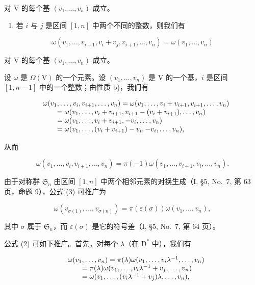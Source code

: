 对 V 的每个基 \((v_{1},\ldots ,v_{n})\) 成立。

\begin{enumerate}
\def\labelenumi{\alph{enumi})}
\setcounter{enumi}{1}
\tightlist
\item
  若 \(i\) 与 \(j\) 是区间 \([1, n]\) 中两个不同的整数，则我们有
\end{enumerate}

\[
\omega (v _ {1}, \ldots , v _ {i - 1}, v _ {i} + v _ {j}, v _ {i + 1}, \ldots , v _ {n}) = \omega (v _ {1}, \ldots , v _ {n})\tag{2}
\]

对 V 的每个基 \((v_{1},\ldots ,v_{n})\) 成立。

设 \(\omega\) 是 \(\Omega(\mathrm{V})\) 的一个元素。设 \((v_1, \ldots, v_n)\) 是 \(\mathrm{V}\) 的一个基，\(i\) 是区间 \([1, n-1]\) 中的一个整数；由性质 b)，我们有

\[
\begin{array}{r l} & {\omega (v _ {1}, \ldots , v _ {i}, v _ {i + 1}, \ldots , v _ {n}) = \omega (v _ {1}, \ldots , v _ {i} + v _ {i + 1}, v _ {i + 1}, \ldots , v _ {n})} \\ & {\qquad = \omega (v _ {1}, \ldots , v _ {i} + v _ {i + 1}, v _ {i + 1} - (v _ {i} + v _ {i + 1}), \ldots , v _ {n})} \\ & {\qquad = \omega (v _ {1}, \ldots , v _ {i} + v _ {i + 1}, - v _ {i}, \ldots , v _ {n})} \\ & {\qquad = \omega (v _ {1}, \ldots , (v _ {i} + v _ {i + 1}) - v _ {i}, - v _ {i}, \ldots , v _ {n}),} \end{array}
\]

从而

\[
\omega (v _ {1}, \dots , v _ {i}, v _ {i + 1}, \dots , v _ {n}) = \pi (- 1) \omega (v _ {1}, \dots , v _ {i + 1}, v _ {i}, \dots , v _ {n}).\tag{3}
\]

由于对称群 \(\mathfrak{S}_n\) 由区间 \([1,n]\) 中两个相邻元素的对换生成（I, §5, No.~7, 第 63 页，命题 9），公式 (3) 可推广为

\[
\omega (v _ {\sigma (1)}, \ldots , v _ {\sigma (n)}) = \pi (\varepsilon (\sigma)) \omega (v _ {1}, \ldots , v _ {n}),\tag{4}
\]

其中 \(\sigma\) 属于 \(\mathfrak{S}_n\)，而 \(\varepsilon (\sigma)\) 是它的符号差（I, §5, No.~7, 第 64 页）。

公式 (2) 可如下推广。首先，对每个 \(\lambda\)（在 \(\mathrm{D}^*\) 中），我们有

\[
\begin{array}{r l} & {\omega (v _ {1}, \ldots , v _ {n}) = \pi (\lambda) \omega (v _ {1}, \ldots , v _ {i} \lambda^ {- 1}, \ldots , v _ {n})} \\ & {\qquad = \pi (\lambda) \omega (v _ {1}, \ldots , v _ {i} \lambda^ {- 1} + v _ {j}, \ldots , v _ {n})} \\ & {\qquad = \omega (v _ {1}, \ldots , (v _ {i} \lambda^ {- 1} + v _ {j}) \lambda , \ldots , v _ {n}),} \end{array}
\]

